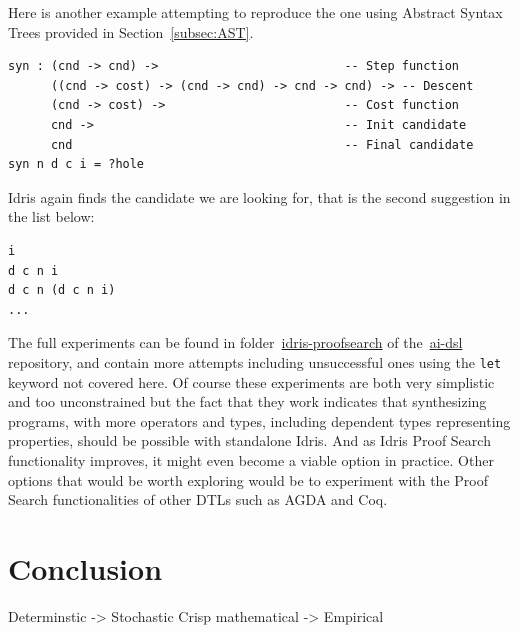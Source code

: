 \documentclass[]{report}
\begin{document}
Here is another example attempting to reproduce the one using Abstract
Syntax Trees provided in Section~\ref{subsec:AST}.
\begin{verbatim}
syn : (cnd -> cnd) ->                          -- Step function
      ((cnd -> cost) -> (cnd -> cnd) -> cnd -> cnd) -> -- Descent
      (cnd -> cost) ->                         -- Cost function
      cnd ->                                   -- Init candidate
      cnd                                      -- Final candidate
syn n d c i = ?hole
\end{verbatim}
Idris again finds the candidate we are looking for, that is the second
suggestion in the list below:
\begin{verbatim}
i
d c n i
d c n (d c n i)
...
\end{verbatim}

The full experiments can be found in folder~\href{https://github.com/singnet/ai-dsl/blob/master/experimental/program-synthesis/idris-proofsearch}{idris-proofsearch}
of the~\href{https://github.com/singnet/ai-dsl}{ai-dsl} repository,
and contain more attempts including unsuccessful ones using the
\texttt{let} keyword not covered here.  Of course these experiments
are both very simplistic and too unconstrained but the fact that they
work indicates that synthesizing programs, with more operators and
types, including dependent types representing properties, should be
possible with standalone Idris.  And as Idris Proof Search
functionality improves, it might even become a viable option in
practice.  Other options that would be worth exploring would be to
experiment with the Proof Search functionalities of other DTLs such as
AGDA and Coq.
\chapter{Conclusion}

Determinstic -> Stochastic
Crisp mathematical -> Empirical

\appendix
\end{document}
